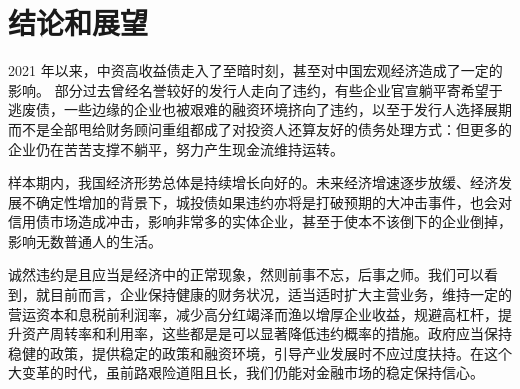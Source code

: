 \chapter{结论和展望}

2021 年以来，中资高收益债走入了至暗时刻，甚至对中国宏观经济造成了一定的影响。
部分过去曾经名誉较好的发行人走向了违约，有些企业官宣躺平寄希望于逃废债，一些边缘的企业也被艰难的融资环境挤向了违约，以至于发行人选择展期而不是全部甩给财务顾问重组都成了对投资人还算友好的债务处理方式：但更多的企业仍在苦苦支撑不躺平，努力产生现金流维持运转。

样本期内，我国经济形势总体是持续增长向好的。未来经济增速逐步放缓、经济发展不确定性增加的背景下，城投债如果违约亦将是打破预期的大冲击事件，也会对信用债市场造成冲击，影响非常多的实体企业，甚至于使本不该倒下的企业倒掉，影响无数普通人的生活。

诚然违约是且应当是经济中的正常现象，然则前事不忘，后事之师。我们可以看到，就目前而言，企业保持健康的财务状况，适当适时扩大主营业务，维持一定的营运资本和息税前利润率，减少高分红竭泽而渔以增厚企业收益，规避高杠杆，提升资产周转率和利用率，这些都是是可以显著降低违约概率的措施。政府应当保持稳健的政策，提供稳定的政策和融资环境，引导产业发展时不应过度扶持。在这个大变革的时代，虽前路艰险道阻且长，我们仍能对金融市场的稳定保持信心。
